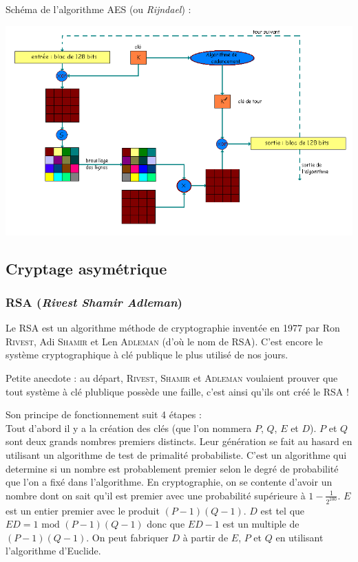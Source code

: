 \documentclass[a4paper,12pt]{article}
\begin{document}
Schéma de l'algorithme AES (ou \emph{Rijndael}) :

\begin{center}
  \includegraphics[width=\textwidth]{../Image/aes.png}
\end{center}


\subsection{Cryptage asymétrique}

\subsubsection{RSA (\emph{Rivest Shamir Adleman})}

Le RSA est un algorithme méthode de cryptographie inventée en 1977 par  Ron \textsc{Rivest}, Adi \textsc{Shamir} et Len \textsc{Adleman} (d'où le nom de RSA). C'est encore le système cryptographique à clé publique le plus utilisé de nos jours.

Petite anecdote : au départ, \textsc{Rivest}, \textsc{Shamir} et \textsc{Adleman} voulaient prouver que tout système à clé plublique possède une faille, c'est ainsi qu'ils ont créé le RSA !

Son principe de fonctionnement suit 4 étapes :\\
Tout d'abord il y a la création des clés (que l'on nommera $P$, $Q$, $E$ et $D$). $P$ et $Q$ sont deux grands nombres premiers distincts. Leur génération se fait au hasard en utilisant un algorithme de test de primalité probabiliste. C'est un algorithme qui determine si un nombre est probablement premier selon le degré de probabilité que l'on a fixé dans l'algorithme. En cryptographie, on se \og contente \fg{} d'avoir un nombre dont on sait qu'il est premier avec une probabilité supérieure à $ 1 - \frac{1}{2^{100}} $. $E$ est un entier premier avec le produit $(P - 1)(Q - 1)$. $D$ est tel que $ED = 1 \textrm{ mod } (P - 1)(Q - 1)$ donc que $ED - 1$ est un multiple de $(P - 1)(Q - 1)$. On peut fabriquer $D$ à partir de $E$, $P$ et $Q$ en utilisant l'algorithme d'Euclide.
\end{document}
